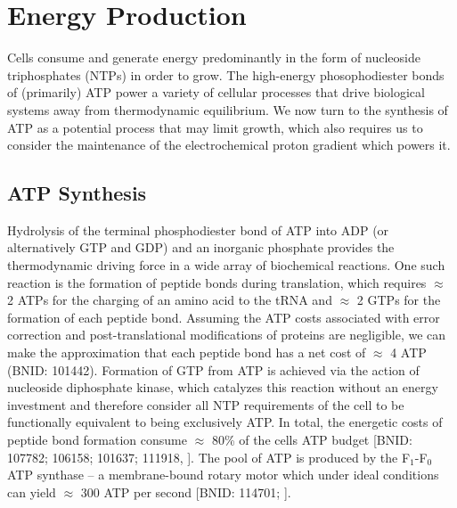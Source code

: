 \section{Energy Production}
Cells consume and generate energy predominantly in the form of nucleoside
triphosphates (NTPs) in order to grow. The high-energy phosophodiester bonds of
(primarily) ATP power a variety of cellular processes that drive biological
systems away from thermodynamic equilibrium. We now turn to the synthesis of ATP
as a potential process that may limit growth, which also requires us to consider
the maintenance of the electrochemical proton gradient which powers it.

\subsection{ATP Synthesis}
Hydrolysis of the terminal phosphodiester bond of ATP into ADP (or
alternatively GTP and GDP) and an inorganic phosphate provides the
thermodynamic driving force in a wide array of biochemical reactions. One
such reaction is the formation of peptide bonds during translation, which
requires $\approx$ 2 ATPs for the charging of an amino acid to the tRNA and
$\approx$ 2 GTPs for the formation of each peptide bond. Assuming the ATP
costs associated with error correction and post-translational modifications
of proteins are negligible, we can make the approximation that each peptide
bond has a net cost of $\approx$ 4 ATP (BNID: 101442).
Formation of GTP from ATP is achieved via the action of nucleoside
diphosphate kinase, which catalyzes this reaction without an energy
investment \citep{lascu2000} and therefore consider all NTP requirements of
the cell to be functionally equivalent to being exclusively ATP. In total,
the energetic costs of peptide bond formation consume $\approx$ 80\% of the
cells ATP budget [BNID: 107782; 106158; 101637; 111918,
\cite{lynch2015,stouthamer1973}]. The pool of ATP is produced by the
F$_1$-F$_0$ ATP synthase -- a membrane-bound rotary motor which under ideal
conditions can yield $\approx$ 300 ATP per second [BNID: 114701;
\cite{weber2003}].

